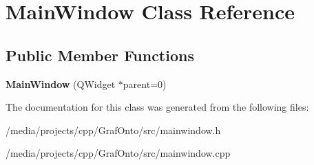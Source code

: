 \hypertarget{class_main_window}{\section{\-Main\-Window \-Class \-Reference}
\label{class_main_window}
}
\subsection*{\-Public \-Member \-Functions}
\begin{DoxyCompactItemize}
\item 
\hypertarget{class_main_window_a8b244be8b7b7db1b08de2a2acb9409db}{{\bfseries \-Main\-Window} (\-Q\-Widget $\ast$parent=0)}\label{class_main_window_a8b244be8b7b7db1b08de2a2acb9409db}

\end{DoxyCompactItemize}


\-The documentation for this class was generated from the following files\-:\begin{DoxyCompactItemize}
\item 
/media/projects/cpp/\-Graf\-Onto/src/mainwindow.\-h\item 
/media/projects/cpp/\-Graf\-Onto/src/mainwindow.\-cpp\end{DoxyCompactItemize}
